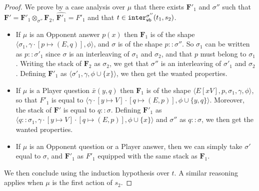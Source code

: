 \documentclass[11pt,a4paper]{amsart}
\theoremstyle{plain}
\theoremstyle{definition}
\theoremstyle{defC}
\theoremstyle{thmC}
\theoremstyle{plain}
\numberwithin{equation}{section}
\newcommand{\tr}{s}
\newcommand{\tracerho}{t}
\newcommand{\stt}{\sigma}
\newcommand{\interlWBs}[3]{{\tt inter_{wb}^{#1}}( #2, #3)}
\newcommand{\FF}{F}
\newcommand{\FFb}{{\bm{\FF}}} %
\newcommand{\es}{\eraseStack}
\newcommand{\pmap}[2]{[#1 \mapsto #2]}
\newcommand{\act}{\mu}
\newcommand{\questPV}[3]{\bar{#1}(#2,#3)}
\newcommand{\ansO}[2]{#1(#2)}
\newcommand{\conf}[1]{\langle #1\rangle}
\newcommand{\eraseStack}[1]{\widehat{#1}}
\theoremstyle{plain}
\theoremstyle{definition}
\begin{document}
\begin{proof}
We prove by a case analysis over $\act$
that there exists $\FFb'_1$ and $\stt''$
such that $\FFb' = \FFb'_1 \otimes_{\stt''} \FFb_2$,
$\es{\FFb'_1} = \FF'_1$
and that $\tracerho \in \interlWBs{\stt''}{\tracerho_1}{\tr_2}$.
\begin{itemize}
  \item If $\act$ is an Opponent answer
  $\ansO{p}{x}$ then $\FFb_1$ is of the shape
  $\conf{\stt_1,\gamma\cdot [p \mapsto (E,q)],\phi}$,
  and $\stt$ is of the shape $p::\stt''$.
  So $\stt_1$ can be written as $p::\stt'_1$
  since $\stt$ is an interleaving of $\stt_1$ and $\stt_2$,
  and that $p$ must belong to $\stt_1$.
  Writing the stack of $\FFb_2$
  as $\stt_2$, we get that
  $\stt''$ is an interleaving of $\stt'_1$ and $\stt_2$.
  Defining $\FFb'_1$ as 
  $\conf{\stt'_1,\gamma,\phi \cup \{x\}}$,
  we then get the wanted properties.
  \item If $\act$ is a Player question
  $\questPV{x}{y}{q}$
  then $\FFb_1$ is of the shape
  $\conf{E[xV],p,\stt_1,\gamma,\phi}$,
  so that $\FF'_1$ is equal to
  $\conf{\gamma \cdot \pmap{y}{V}\cdot \pmap{q}{(E,p)},\phi \cup \{y,q\}}$.
  Moreover, the stack of $\FFb'$ is equal to
  $q::\stt$.
  Defining $\FFb'_1$ as 
  $\conf{q::\stt_1,\gamma \cdot \pmap{y}{V}\cdot \pmap{q}{(E,p)},\phi \cup \{x\}}$
  and $\stt''$ as $q::\stt$,
  we then get the wanted properties.
  \item If $\act$ is an Opponent question or a Player answer,
  then we can simply take $\stt'$ equal to $\stt$,
  and $\FFb'_1$ as $\FF'_1$ equipped with the same stack
  as $\FFb_1$.
\end{itemize}
\noindent
We then conclude using the induction hypothesis over $\tracerho$.
A similar reasoning applies when $\act$ is the first action of $\tr_2$.
\end{proof}
\end{document}
